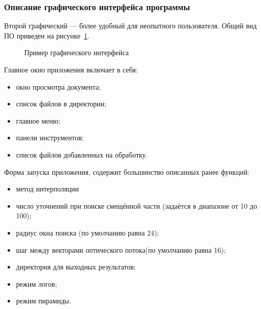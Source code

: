 \subsubsection{Описание графического интерфейса программы}
Второй графический — более удобный для неопытного пользователя. Общий вид ПО приведен на рисунке \ref{pic:gui_scr}. 
\begin{figure}[ht]
\caption{Пример графического интерфейса}
\label{pic:gui_scr}
\end{figure}
Главное окно приложения включает в себя:
\begin{itemize}
\item окно просмотра документа;
\item список файлов в директории;
\item главное меню;
\item панели инструментов;
\item список файлов добавленных на обработку.
\end{itemize}
Форма запуска приложения, содержит большинство описанных ранее функций:
\begin{itemize}
\item метод интерполяции
\item число уточнений при поиске смещённой части (задаётся в диапазоне от 10 до 100);
\item радиус окна поиска (по умолчанию равна 24);
\item шаг между векторами оптического потока(по умолчанию равна 16);
\item директория для выходных результатов;
\item режим логов;
\item режим пирамиды.
\end{itemize}